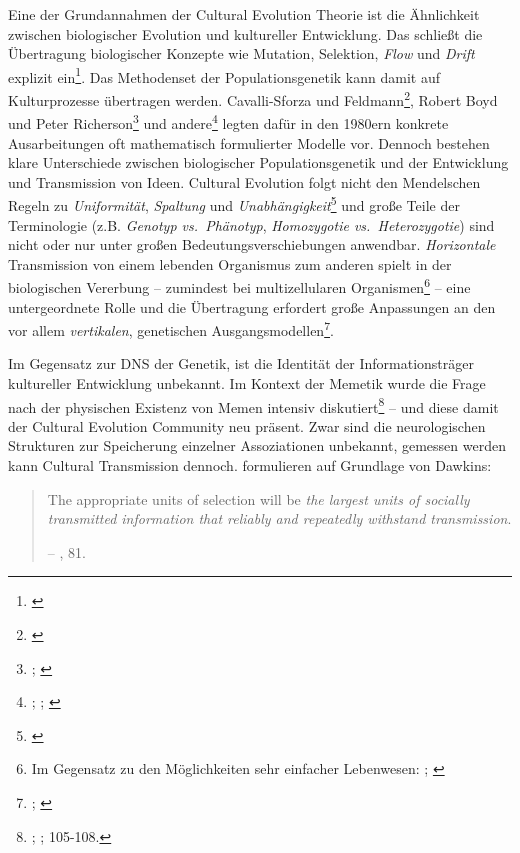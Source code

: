 \documentclass[openany,twoside,twocolumn]{book}
\let\rmarkdownfootnote\footnote%
\def\footnote{\protect\rmarkdownfootnote}
\begin{document}
Eine der Grundannahmen der Cultural Evolution Theorie ist die
Ähnlichkeit zwischen biologischer Evolution und kultureller Entwicklung.
Das schließt die Übertragung biologischer Konzepte wie Mutation,
Selektion, \emph{Flow} und \emph{Drift} explizit ein\footnote{\textcite{smith_cultural_1992}}.
Das Methodenset der Populationsgenetik kann damit auf Kulturprozesse
übertragen werden. Cavalli-Sforza und Feldmann\footnote{\textcite{cavalli-sforza_cultural_1981}},
Robert Boyd und Peter Richerson\footnote{\textcite{richerson_dual_1978};
  \textcite{boyd_culture_1985}} und andere\footnote{\textcite{campbell_variation_1965};
  \textcite{pulliam_programmed_1980}; \textcite{lumsden_genes_1981}}
legten dafür in den 1980ern konkrete Ausarbeitungen oft mathematisch
formulierter Modelle vor. Dennoch bestehen klare Unterschiede zwischen
biologischer Populationsgenetik und der Entwicklung und Transmission von
Ideen. Cultural Evolution folgt nicht den Mendelschen Regeln zu
\emph{Uniformität}, \emph{Spaltung} und \emph{Unabhängigkeit}\footnote{\textcite{mesoudi_pursuing_2017}}
und große Teile der Terminologie (z.B. \emph{Genotyp vs.~Phänotyp},
\emph{Homozygotie vs.~Heterozygotie}) sind nicht oder nur unter großen
Bedeutungsverschiebungen anwendbar. \emph{Horizontale} Transmission von
einem lebenden Organismus zum anderen spielt in der biologischen
Vererbung -- zumindest bei multizellularen Organismen\footnote{Im
  Gegensatz zu den Möglichkeiten sehr einfacher Lebenwesen:
  \textcite{woese_new_2004}; \textcite{woese_interpreting_2000}} -- eine
untergeordnete Rolle und die Übertragung erfordert große Anpassungen an
den vor allem \emph{vertikalen}, genetischen Ausgangsmodellen\footnote{\textcite{cavalli-sforza_cultural_1973};
  \textcite{feldman_cultural_1976}}.

Im Gegensatz zur DNS der Genetik, ist die Identität der
Informationsträger kultureller Entwicklung unbekannt. Im Kontext der
Memetik wurde die Frage nach der physischen Existenz von Memen intensiv
diskutiert\footnote{\textcite{delius_nature_1991};
  \textcite{wilkinson_memes_1999}; \textcite{blackmore_macht_2000}
  105-108.} -- und diese damit der Cultural Evolution Community neu
präsent. Zwar sind die neurologischen Strukturen zur Speicherung
einzelner Assoziationen unbekannt, gemessen werden kann Cultural
Transmission dennoch. \textcite{pocklington_cultural_1997} formulieren
auf Grundlage von Dawkins:

\begin{quote}
The appropriate units of selection will be \emph{the largest units of
socially transmitted information that reliably and repeatedly withstand
transmission}.

-- \textcite{pocklington_cultural_1997}, 81.
\end{quote}
\end{document}
